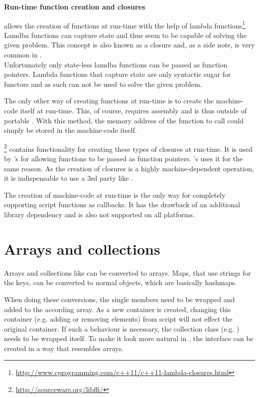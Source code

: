 \textbf{Run-time function creation and closures}

 allows the creation of functions at run-time with the help of lambda functions\footnote{\url{http://www.cprogramming.com/c++11/c++11-lambda-closures.html}}. Lamdba functions can capture state and thus seem to be capable of solving the given problem. This concept is also known as a closure and, as a side note, is very common in .
\\Unfortunately only state-less lamdba functions can be passed as function pointers. Lambda functions that capture state are only syntactic sugar for functors and as such can not be used to solve the given problem.

The only other way of creating functions at run-time is to create the machine-code itself at run-time. This, of course, requires assembly and is thus outside of portable . With this method, the memory address of the  function to call could simply be stored in the machine-code itself.

\footnote{\url{http://sourceware.org/libffi/}} contains functionality for creating these types of closures at run-time. It is used by 's  for allowing  functions to be passed as  function pointers. 's  uses it for the same reason. As the creation of closures is a highly machine-dependent operation, it is indispensable to use a 3rd party like .

The creation of machine-code at run-time is the only way for completely supporting script functions as callbacks. It has the drawback of an additional library dependency and is also not supported on all platforms.

\section{Arrays and collections}

Arrays and collections like  can be converted to  arrays. Maps, that use strings for the keys, can be converted to normal  objects, which are basically hashmaps.

When doing these conversions, the single members need to be wrapped and added to the according  array. As a new  container is created, changing this container (e.g. adding or removing elements) from script will not effect the original  container. If such a behaviour is necessary, the collection class (e.g. ) needs to be wrapped itself. To make it look more natural in , the interface can be created in a way that resembles  arrays.

